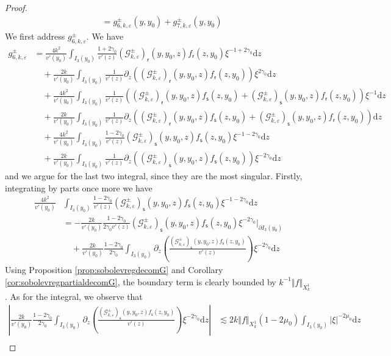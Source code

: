 \documentclass[11pt,reqno]{amsproc}
\theoremstyle{definition}
\numberwithin{equation}{section}
\newcommand{\G}{{\mathcal{G}}}
\newcommand{\sr}{{\mathsf{r}}}
\newcommand{\s}{{\mathsf{s}}}
\renewcommand{\d}{\mathrm{d}}
\newcommand{\ep}{\varepsilon}
\begin{document}
\begin{proof}
\begin{align*}
&= g_{6,k,\ep}^\pm(y,y_0) + g_{7,k,\ep}^\pm(y,y_0)
\end{align*}
We first address $g_{6,k,\ep}^\pm$. We have
\begin{align*}
g_{6,k,\ep}^\pm &= \frac{4k^2}{v'(y_0)} \int_{I_3(y_0)} \frac{1+2\gamma_0}{v'(z)}  \left(\G_{k,\ep}^\pm \right)_\sr (y,y_0,z) f_\sr(z,y_0) \xi^{-1+2\gamma_0} \d z \\
&\quad +  \frac{2k}{v'(y_0)} \int_{I_3(y_0)} \frac{1}{v'(z)}  \partial_z \left( \left(\G_{k,\ep}^\pm \right)_\sr (y,y_0,z) f_\sr(z,y_0) \right) \xi^{2\gamma_0} \d z \\
&\quad+ \frac{4k^2}{v'(y_0)} \int_{I_3(y_0)} \frac{1}{v'(z)} \left( \left(\G_{k,\ep}^\pm \right)_\sr (y,y_0,z) f_\s(z,y_0)  +  \left(\G_{k,\ep}^\pm \right)_\s (y,y_0,z) f_\sr(z,y_0) \right)  \xi^{-1} \d z \\
&\quad + \frac{2k}{v'(y_0)} \int_{I_3(y_0)} \frac{1}{v'(z)} \partial_z \left( \left(\G_{k,\ep}^\pm \right)_\sr (y,y_0,z) f_\s(z,y_0)  +  \left(\G_{k,\ep}^\pm \right)_\s (y,y_0,z) f_\sr(z,y_0) \right)  \d z \\
&\quad + \frac{4k^2}{v'(y_0)} \int_{I_3(y_0)} \frac{1-2\gamma_0}{v'(z)}  \left(\G_{k,\ep}^\pm \right)_\s (y,y_0,z) f_\s(z,y_0) \xi^{-1-2\gamma_0} \d z \\
&\quad +  \frac{2k}{v'(y_0)} \int_{I_3(y_0)} \frac{1}{v'(z)}  \partial_z \left( \left(\G_{k,\ep}^\pm \right)_\s (y,y_0,z) f_\s(z,y_0) \right) \xi^{-2\gamma_0} \d z 
\end{align*}
and we argue for the last two integral, since they are the most singular. Firstly, integrating by parts once more we have 
\begin{align*}
\frac{4k^2}{v'(y_0)}& \int_{I_3(y_0)} \frac{1-2\gamma_0}{v'(z)}  \left(\G_{k,\ep}^\pm \right)_\s (y,y_0,z) f_\s(z,y_0) \xi^{-1-2\gamma_0} \d z \\
&= -\frac{2k}{v'(y_0)}\frac{1-2\gamma_0}{2\gamma_0 v'(z)}\left(\G_{k,\ep}^\pm \right)_\s (y,y_0,z) f_\s(z,y_0) \xi^{-2\gamma_0} \Big|_{\partial I_3(y_0)} \\
&\quad + \frac{2k}{v'(y_0)}\frac{1-2\gamma_0}{2\gamma_0}\int_{I_3(y_0)} \partial_z \left( \frac{\left(\G_{k,\ep}^\pm \right)_\s (y,y_0,z) f_\s(z,y_0)}{v'(z)} \right) \xi^{-2\gamma_0} \d z
\end{align*}
Using Proposition \ref{prop:sobolevregdecomG} and Corollary \ref{cor:sobolevregpartialdecomG}, the boundary term is clearly bounded by $k^{-1}\Vert f \Vert_{X_k^1}$. As for the integral, we observe that 
\begin{align*}
\left|\frac{2k}{v'(y_0)}\frac{1-2\gamma_0}{2\gamma_0}\int_{I_3(y_0)} \partial_z \left( \frac{\left(\G_{k,\ep}^\pm \right)_\s (y,y_0,z) f_\s(z,y_0)}{v'(z)} \right) \xi^{-2\gamma_0} \d z \right| &\lesssim 2k\Vert f \Vert_{X_k^1}(1-2\mu_0)\int_{I_3(y_0)}|\xi|^{-2\mu_0} \d z\\

\end{align*}
\end{proof}
\end{document}
